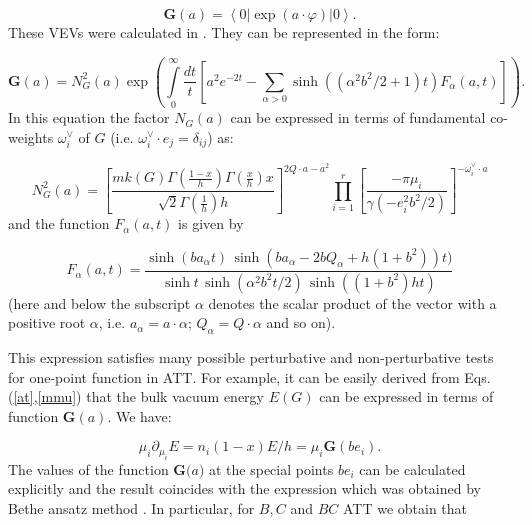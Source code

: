 \documentclass[a4paper,12pt,titlepage,final]{article}
\begin{document}
\begin{equation}
\mathbf{G}(a)=\left\langle 0|\exp (a\cdot \varphi )|0\right\rangle .
\label{G}
\end{equation}
These VEVs were calculated in \cite{ABF}. They can be represented in the
form:

\begin{equation}
\mathbf{G}(a)=N_{G}^{2}(a)\exp \left( \int\limits_{0}^{\infty }
\frac{dt}{t}[a^{2}e^{-2t}-\sum_{\alpha >0}\sinh ((\alpha ^{2}b^{2}/2+1)t)
F_{\alpha }(a,t)]\right) .  \label{GG}
\end{equation}
In this equation the factor $N_{G}(a)$ can be expressed in terms of
fundamental co-weights $\omega _{i}^{\vee }$ of $G$
(i.e. $\omega _{i}^{\vee}\cdot e_{j}=\delta _{ij}$) as:

\begin{equation}
N_{G}^{2}(a)=\left[ \frac{mk(G)\Gamma \left( \frac{1-x}{h}\right) \Gamma
\left( \frac{x}{h}\right) x}{\sqrt{2}\Gamma \left( \frac{1}{h}\right) h}
\right] ^{2Q\cdot a-a^{2}}\prod_{i=1}^{r}\left[ \frac{-\pi \mu _{i}}{\gamma
\left( -e_{i}^{2}b^{2}/2\right) }\right] ^{-\omega _{i}^{\vee }\cdot a}
\label{NA}
\end{equation}
and the function $F_{\alpha }(a,t)$ is given by

\begin{equation}
F_{\alpha }(a,t)=\frac{\sinh (ba_{\alpha }t)\,\sinh (ba_{\alpha 
}-2bQ_{\alpha
}+h(1+b^{2}))t)}{\sinh t\,\sinh (\alpha ^{2}b^{2}t/2)\,\sinh ((1+b^{2})ht)}
\label{Fa}
\end{equation}
(here and below the subscript $\alpha $ denotes the scalar product of the
vector with a positive root $\alpha $, i.e. $a_{\alpha }=a\cdot \alpha $;
$Q_{\alpha }=Q\cdot \alpha $ and so on).

This expression satisfies many possible perturbative and non-perturbative
tests for one-point function in ATT. For example, it can be easily derived
from Eqs.(\ref{at},\ref{mmu}) that the bulk vacuum energy $E(G)$ can be
expressed in terms of function $\mathbf{G}(a)$. We have:

\begin{equation}
\mu _{i}\partial _{\mu _{i}}E=n_{i}(1-x)E/h=\mu _{i}\mathbf{G}(be_{i}).
\label{EB}
\end{equation}
The values of the function $\mathbf{G(}a\mathbf{)}$ at the special points
$be_{i}$ can be calculated explicitly and the result coincides with the
expression which was obtained by Bethe ansatz method \cite{ABF}. In
particular, for $B,C$ and $BC$ ATT we obtain that
\end{document}

